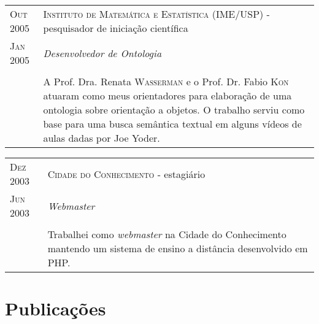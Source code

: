 \documentclass[letter,10pt]{article}
\begin{document}
\begin{tabular}{p{2.5cm}|p{13.5cm}}
  \textsc{Out 2005} & \textsc{Instituto de Matemática e Estatística
    (IME/USP)} - pesquisador de iniciação científica\\
  \textsc{Jan 2005}& \emph{Desenvolvedor de Ontologia}\\
  &\\
  & A Prof. Dra. Renata \textsc{Wasserman} e o Prof. Dr. Fabio
  \textsc{Kon} atuaram como meus orientadores para elaboração de uma
  ontologia sobre orientação a objetos. O trabalho serviu como base
  para uma busca semântica textual em alguns vídeos de aulas dadas por
  Joe Yoder.
\end{tabular}

\begin{tabular}{p{2.5cm}|p{13.5cm}}
  \textsc{Dez 2003} & \textsc{Cidade do Conhecimento} - estagiário\\
  \textsc{Jun 2003}& \emph{Webmaster}\\
  &\\
  & Trabalhei como \textit{webmaster} na Cidade do Conhecimento
  mantendo um sistema de ensino a distância desenvolvido em PHP.
\end{tabular}

\section{Publicações}
\end{document}

